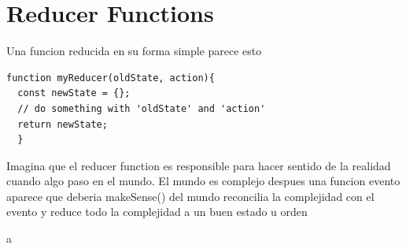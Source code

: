 \section{Reducer Functions}
Una funcion reducida en su forma simple parece esto
\begin{lstlisting}[language=html]
function myReducer(oldState, action){
  const newState = {};
  // do something with 'oldState' and 'action'
  return newState;
  }
\end{lstlisting}
Imagina que el reducer function es responsible para hacer sentido de la realidad cuando algo paso en el mundo. El mundo es complejo despues una  funcion evento aparece que deberia makeSense() del mundo reconcilia la complejidad con el evento y reduce todo la complejidad a un buen estado u orden







a
